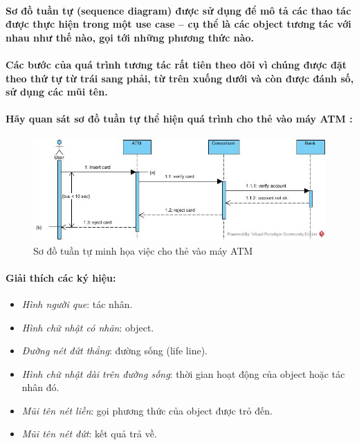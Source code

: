 \documentclass{article}
\begin{document}
  \paragraph{\textnormal{Sơ đồ tuần tự (sequence diagram) được sử dụng để mô tả các thao tác được thực hiện trong một use case -- cụ thể là các object tương tác với nhau như thế nào, gọi tới những phương thức nào.}}

  \paragraph{\textnormal{Các bước của quá trình tương tác rất tiên theo dõi vì chúng được đặt theo thứ tự từ trái sang phải, từ trên xuống dưới và còn được đánh số, sử dụng các mũi tên.}}

  \paragraph{\textnormal{Hãy quan sát sơ đồ tuần tự thể hiện quá trình cho thẻ vào máy ATM :}}

  \begin{figure}[!ht]
    \centering
    \includegraphics[scale=0.5]{../pictures/diagrams/sequence/sequence-diagram-1.jpg}
    \caption{Sơ đồ tuần tự minh họa việc cho thẻ vào máy ATM}
  \end{figure}

  \paragraph{\textnormal{Giải thích các ký hiệu:}}
  
  \begin{itemize}
    \item \textit{Hình người que}: tác nhân.
    \item \textit{Hình chữ nhật có nhãn}: object.
    \item \textit{Đường nét đứt thẳng}: đường sống (life line).
    \item \textit{Hình chữ nhật dài trên đường sống}: thời gian hoạt động của object hoặc tác nhân đó.
    \item \textit{Mũi tên nét liền}: gọi phương thức của object được trỏ đến.
    \item \textit{Mũi tên nét đứt}: kết quả trả về.
  \end{itemize}
\end{document}
